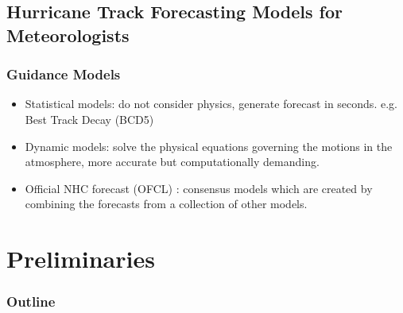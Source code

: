 \documentclass{beamer}
\begin{document}
\subsection{Hurricane Track Forecasting Models for Meteorologists }



\begin{frame}
\frametitle{Guidance Models}
\begin{itemize}
	\item Statistical models: do not consider physics, generate forecast in seconds. e.g. Best Track Decay (BCD5)
	\item Dynamic models: solve the physical equations governing the motions in the atmosphere, more accurate but computationally demanding. 
	\item Official NHC forecast (OFCL) :  consensus models which are created by combining the forecasts from a collection of other models.
\end{itemize}
\end{frame}
 

 
\section{Preliminaries}
\begin{frame}
\frametitle{Outline} %
\tableofcontents[currentsection] %
\end{frame}
\end{document}
